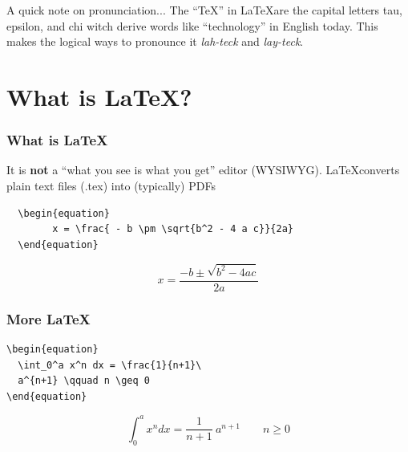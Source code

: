\documentclass{beamer}
\begin{document}
\begin{frame}{A quick note on pronunciation...}
  The ``TeX'' in \LaTeX are the capital letters tau, epsilon, and chi witch derive words like ``technology'' in English today. This makes the logical ways to pronounce it \textit{lah-teck} and \textit{lay-teck}.
\end{frame}

\section{What is \LaTeX?}

\begin{frame}[fragile]
  \frametitle{What is \LaTeX}

  It is \textbf{not} a ``what you see is what you get'' editor (WYSIWYG). \LaTeX converts plain text files (.tex) into (typically) PDFs

\begin{verbatim}
  \begin{equation}
        x = \frac{ - b \pm \sqrt{b^2 - 4 a c}}{2a}
  \end{equation}
\end{verbatim}
\par
  \hrulefill\par
  \begin{equation}
        x = \frac{ - b \pm \sqrt{b^2 - 4 a c}}{2a}
  \end{equation}

\end{frame}

\begin{frame}[fragile]
\frametitle{More \LaTeX}
\begin{verbatim}
\begin{equation}
  \int_0^a x^n dx = \frac{1}{n+1}\
  a^{n+1} \qquad n \geq 0
\end{equation}
\end{verbatim}\par
  \hrulefill\par

\begin{equation}
  \int_0^a x^n dx = \frac{1}{n+1}\
  a^{n+1} \qquad n \geq 0
\end{equation}

\end{frame}
\end{document}
